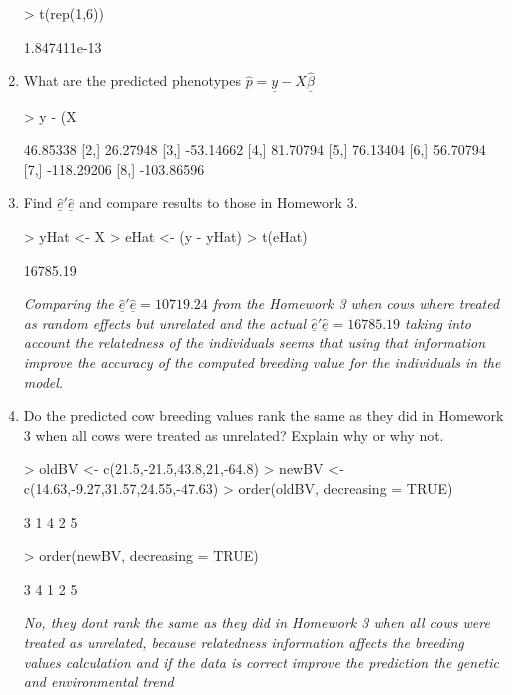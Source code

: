 \documentclass[12pt,a4paper]{paper}
\begin{document}
\begin{enumerate}[resume]
\begin{Schunk}
\begin{Sinput}
> t(rep(1,6)) %*% Ainv %*% uHat
\end{Sinput}
\begin{Soutput}
             [,1]
[1,] 1.847411e-13
\end{Soutput}
\end{Schunk}
\item What are the predicted phenotypes $\hat{p} = \underline{y} - X\underline{\hat{\beta}}$
\begin{Schunk}
\begin{Sinput}
> y - (X %*% betaHat)
\end{Sinput}
\begin{Soutput}
           [,1]
[1,]   46.85338
[2,]   26.27948
[3,]  -53.14662
[4,]   81.70794
[5,]   76.13404
[6,]   56.70794
[7,] -118.29206
[8,] -103.86596
\end{Soutput}
\end{Schunk}
\item Find $\underline{\hat{e}}'\underline{\hat{e}}$ and compare results to those in Homework 3.
\begin{Schunk}
\begin{Sinput}
> yHat <- X %*% betaHat + Z %*% uHat
> eHat <- (y - yHat)
> t(eHat) %*% eHat
\end{Sinput}
\begin{Soutput}
         [,1]
[1,] 16785.19
\end{Soutput}
\end{Schunk}
\textit{Comparing the $\underline{\hat{e}}'\underline{\hat{e}} = 10719.24$ from the Homework 3 when cows where treated as random effects but unrelated and the actual $\underline{\hat{e}}'\underline{\hat{e}} = 16785.19$ taking into account the relatedness of the individuals seems that using that information improve the accuracy of the computed breeding value for the individuals in the model.}
\item Do the predicted cow breeding values rank the same as they did in Homework 3 when all cows were treated as unrelated? Explain why or why not.
\begin{Schunk}
\begin{Sinput}
> oldBV <- c(21.5,-21.5,43.8,21,-64.8)
> newBV <- c(14.63,-9.27,31.57,24.55,-47.63)
> order(oldBV, decreasing = TRUE) 
\end{Sinput}
\begin{Soutput}
[1] 3 1 4 2 5
\end{Soutput}
\begin{Sinput}
> order(newBV, decreasing = TRUE)
\end{Sinput}
\begin{Soutput}
[1] 3 4 1 2 5
\end{Soutput}
\end{Schunk}
\textit{No, they dont rank the same as they did in Homework 3 when all cows were treated as unrelated, because relatedness information affects the breeding values calculation and if the data is correct improve the prediction the genetic and environmental trend}
\end{enumerate}
\end{document}

